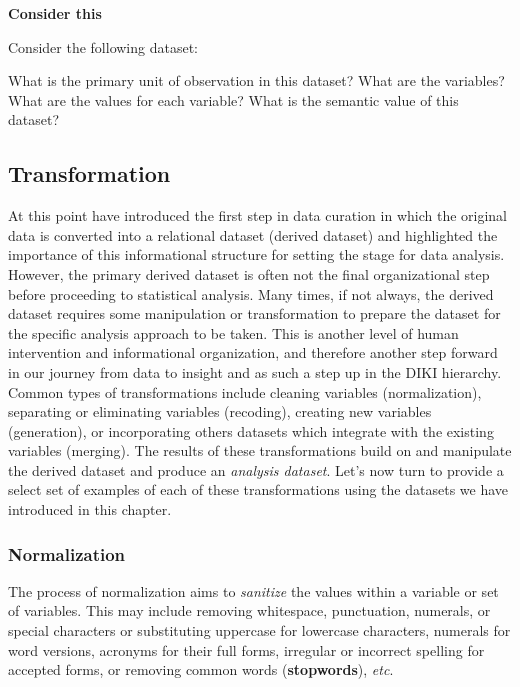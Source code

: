 \documentclass[
  letterpaper,
]{latex/krantz}
\begin{document}
\begin{tcolorbox}[enhanced jigsaw, arc=.35mm, leftrule=.75mm, rightrule=.15mm, opacityback=0, colback=white, breakable, bottomrule=.15mm, left=2mm, toprule=.15mm]

\textbf{ Consider this}

Consider the following dataset:

What is the primary unit of observation in this dataset? What are the
variables? What are the values for each variable? What is the semantic
value of this dataset?

\end{tcolorbox}

\hypertarget{transformation}{%
\subsection{Transformation}\label{transformation}}

At this point have introduced the first step in data curation in which
the original data is converted into a relational dataset (derived
dataset) and highlighted the importance of this informational structure
for setting the stage for data analysis. However, the primary derived
dataset is often not the final organizational step before proceeding to
statistical analysis. Many times, if not always, the derived dataset
requires some manipulation or transformation to prepare the dataset for
the specific analysis approach to be taken. This is another level of
human intervention and informational organization, and therefore another
step forward in our journey from data to insight and as such a step up
in the DIKI hierarchy. Common types of transformations include cleaning
variables (normalization), separating or eliminating variables
(recoding), creating new variables (generation), or incorporating others
datasets which integrate with the existing variables (merging). The
results of these transformations build on and manipulate the derived
dataset and produce an \emph{analysis dataset}. Let's now turn to
provide a select set of examples of each of these transformations using
the datasets we have introduced in this chapter.

\hypertarget{normalization}{%
\subsubsection{Normalization}\label{normalization}}

The process of normalization aims to \emph{sanitize} the values within a
variable or set of variables. This may include removing whitespace,
punctuation, numerals, or special characters or substituting uppercase
for lowercase characters, numerals for word versions, acronyms for their
full forms, irregular or incorrect spelling for accepted forms, or
removing common words (\textbf{stopwords}), \emph{etc}.
\end{document}
